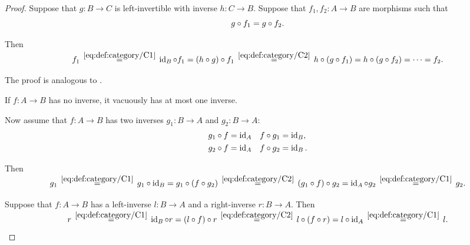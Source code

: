 \begin{proof}
   Suppose that \( g: B \to C \) is left-invertible with inverse \( h: C \to B \). Suppose that \( f_1, f_2: A \to B \) are morphisms such that
  \begin{equation*}
    g \mathbin \circ f_1 = g \mathbin \circ f_2.
  \end{equation*}

  Then
  \begin{equation*}
    f_1
    \reloset {\eqref{eq:def:category/C1}} =
    \id_B \bincirc f_1
    =
    (h \bincirc g) \bincirc f_1
    \reloset {\eqref{eq:def:category/C2}} =
    h \bincirc (g \bincirc f_1)
    =
    h \bincirc (g \bincirc f_2)
    =
    \cdots
    =
    f_2.
  \end{equation*}

   The proof is analogous to .

   If \( f: A \to B \) has no inverse, it vacuously has at most one inverse.

  Now assume that \( f: A \to B \) has two inverses \( g_1: B \to A \) and \( g_2: B \to A \):
  \begin{align*}
    g_1 \mathbin \circ f = \operatorname{id}_A &&& f \mathbin \circ g_1 = \operatorname{id}_B, \\
    g_2 \mathbin \circ f = \operatorname{id}_A &&& f \mathbin \circ g_2 = \operatorname{id}_B.
  \end{align*}

  Then
  \begin{equation*}
    g_1
    \reloset {\eqref{eq:def:category/C1}} =
    g_1 \bincirc \id_B
    =
    g_1 \bincirc (f \bincirc g_2)
    \reloset {\eqref{eq:def:category/C2}} =
    (g_1 \bincirc f) \bincirc g_2
    =
    \id_A \bincirc g_2
    \reloset {\eqref{eq:def:category/C1}} =
    g_2.
  \end{equation*}

   Suppose that \( f: A \to B \) has a left-inverse \( l: B \to A \) and a right-inverse \( r: B \to A \). Then
  \begin{equation*}
    r
    \reloset {\eqref{eq:def:category/C1}} =
    \id_B \bincirc r
    =
    (l \bincirc f) \bincirc r
    \reloset {\eqref{eq:def:category/C2}} =
    l \bincirc (f \bincirc r)
    =
    l \bincirc \id_A
    \reloset {\eqref{eq:def:category/C1}} =
    l.
  \end{equation*}
\end{proof}

